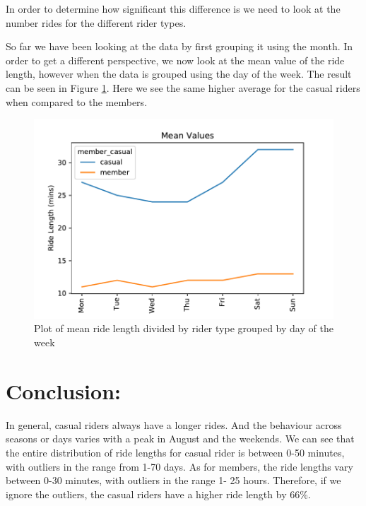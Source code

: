 \documentclass[12pt]{article}
\begin{document}
\begin{itemize}
In order to determine how significant this difference is we need to look at the number rides for the different rider types. 
	
So far we have been looking at the data by first grouping it using the month. In order to get a different perspective, we now look at the mean value of the ride length, however when the data is grouped using the day of the week. The result can be seen in Figure \ref{fig14}. Here we see the same higher average for the casual riders when compared to the members.  

	\begin{figure}[h]
	\centering
	\includegraphics[scale=0.6]{mean_cvsm_dayofweek.pdf} 
	\caption{Plot of mean ride length divided by rider type grouped by day of the week}
	\label{fig14}
	\end{figure}
	
\end{itemize}

\section*{Conclusion:}

In general, casual riders always have a longer rides. And the behaviour across seasons or days varies with a peak in August and the weekends. We can see that the entire distribution of ride lengths for casual rider is between 0-50 minutes, with outliers in the range from 1-70 days. As for members, the ride lengths vary between 0-30 minutes, with outliers in the range 1- 25 hours. Therefore, if we ignore the outliers, the casual riders have a higher ride length by 66\%.
\end{document}
